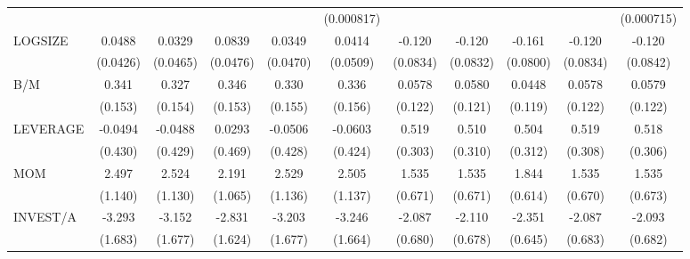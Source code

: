 \begin{table}[htbp]
\begin{tabular}{l*{10}{c}}
                &                  &                  &                  &                  &(0.000817)         &                  &                  &                  &                  &(0.000715)         \\
LOGSIZE         &   0.0488         &   0.0329         &   0.0839\sym{*}  &   0.0349         &   0.0414         &   -0.120         &   -0.120         &   -0.161\sym{**} &   -0.120         &   -0.120         \\
                & (0.0426)         & (0.0465)         & (0.0476)         & (0.0470)         & (0.0509)         & (0.0834)         & (0.0832)         & (0.0800)         & (0.0834)         & (0.0842)         \\
B/M             &    0.341\sym{**} &    0.327\sym{**} &    0.346\sym{**} &    0.330\sym{**} &    0.336\sym{**} &   0.0578         &   0.0580         &   0.0448         &   0.0578         &   0.0579         \\
                &  (0.153)         &  (0.154)         &  (0.153)         &  (0.155)         &  (0.156)         &  (0.122)         &  (0.121)         &  (0.119)         &  (0.122)         &  (0.122)         \\
LEVERAGE        &  -0.0494         &  -0.0488         &   0.0293         &  -0.0506         &  -0.0603         &    0.519\sym{*}  &    0.510         &    0.504         &    0.519\sym{*}  &    0.518\sym{*}  \\
                &  (0.430)         &  (0.429)         &  (0.469)         &  (0.428)         &  (0.424)         &  (0.303)         &  (0.310)         &  (0.312)         &  (0.308)         &  (0.306)         \\
MOM             &    2.497\sym{**} &    2.524\sym{**} &    2.191\sym{**} &    2.529\sym{**} &    2.505\sym{**} &    1.535\sym{**} &    1.535\sym{**} &    1.844\sym{***}&    1.535\sym{**} &    1.535\sym{**} \\
                &  (1.140)         &  (1.130)         &  (1.065)         &  (1.136)         &  (1.137)         &  (0.671)         &  (0.671)         &  (0.614)         &  (0.670)         &  (0.673)         \\
INVEST/A        &   -3.293\sym{*}  &   -3.152\sym{*}  &   -2.831\sym{*}  &   -3.203\sym{*}  &   -3.246\sym{*}  &   -2.087\sym{***}&   -2.110\sym{***}&   -2.351\sym{***}&   -2.087\sym{***}&   -2.093\sym{***}\\
                &  (1.683)         &  (1.677)         &  (1.624)         &  (1.677)         &  (1.664)         &  (0.680)         &  (0.678)         &  (0.645)         &  (0.683)         &  (0.682)         \\

\end{tabular}
\end{table}
